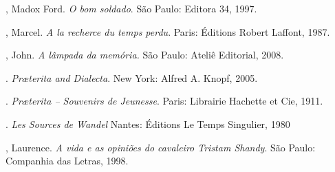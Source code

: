 

 \begin{bibliohedra}
 , Madox Ford. \textit{O bom soldado}. São Paulo: Editora 34, 1997.

 , Marcel. \textit{A la recherce du temps perdu}. Paris: Éditions
 Robert Laffont, 1987.

 , John. \textit{A lâmpada da memória.} São Paulo: Ateliê Editorial, 2008.

 \titidem. \textit{Pr\ae terita and Dialecta}. New York: Alfred A. Knopf, 2005.

 \titidem. \textit{Pr\ae terita -- Souvenirs de Jeunesse}. Paris: Librairie Hachette et Cie, 1911.

 \titidem. \textit{Les Sources de Wandel} Nantes: Éditions Le Temps Singulier, 1980

 , Laurence. \textit{A vida e as opiniões do cavaleiro Tristam
 Shandy}. São Paulo: Companhia das Letras, 1998.
 \end{bibliohedra}
